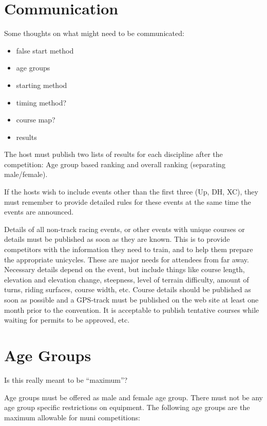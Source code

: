 \section{Communication}

\begin{comment2016}
Some thoughts on what might need to be communicated:
\begin{itemize}
\item false start method
\item age groups
\item starting method
\item timing method?
\item course map?
\item results
\end{itemize}
\end{comment2016}

The host must publish two lists of results for each discipline after the competition: Age group based ranking and overall ranking (separating male/female).

If the hosts wish to include events other than the first three (Up, DH, XC), they must remember to provide detailed rules for these events at the same time the events are announced.

Details of all non-track racing events, or other events with unique courses or details must be published as soon as they are known.
This is to provide competitors with the information they need to train, and to help them prepare the appropriate unicycles.
These are major needs for attendees from far away.
Necessary details depend on the event, but include things like course length, elevation and elevation change, steepness, level of terrain difficulty, amount of turns, riding surfaces, course width, etc.
Course details should be published as soon as possible and a GPS-track must be published on the web site at least one month prior to the convention.
It is acceptable to publish tentative courses while waiting for permits to be approved, etc.

\section{Age Groups}

\begin{comment2016}%
Is this really meant to be ``maximum''?
\end{comment2016}

Age groups must be offered as male and female age group.
There must not be any age group specific restrictions on equipment.
The following age groups are the maximum allowable for muni competitions:

